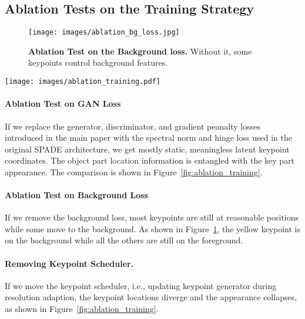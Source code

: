 \documentclass[10pt, conference, compsocconf]{IEEEtran}
\begin{document}
\subsection{Ablation Tests on the Training Strategy}

\begin{figure}
\texttt{[image: images/ablation\_bg\_loss.jpg]}
  \caption{\textbf{Ablation Test on the Background loss.} Without it, some keypoints control background features.
}
\label{fig:ablation_bg_loss}
\end{figure}

\begin{figure*}[t]
\begin{center}
   \texttt{[image: images/ablation\_training.pdf]}
\end{center}
   \caption{(Left) \textbf{GAN Loss Importance.} Without gradient penality + logistic loss, as in SPADE, keypoint coordinates remain static. (Right) \textbf{Scheduling the keypoint generator learning rate.} Reducing the learning rate after each progressive up-scaling step prevents mode collapse and enables high-resolution training. }
\label{fig:ablation_training}
\end{figure*}

\paragraph{Ablation Test on GAN Loss}
If we replace the generator, discriminator, and gradient peanalty losses introduced in the main paper  with the spectral norm \cite{miyato2018spectral} and hinge loss \cite{miyato2018spectral, park2019semantic} used in the original SPADE architecture, we get mostly static, meaningless  latent keypoint coordinates. The object part location information is entangled with the key part appearance. The comparison is shown in Figure~\ref{fig:ablation_training}.

\paragraph{Ablation Test on Background Loss}
If we remove the background loss, most keypoints are still at reasonable positions while some move to the background. As shown in Figure~\ref{fig:ablation_bg_loss}, the yellow keypoint is on the background while all the others are still on the foreground. 

\paragraph{Removing Keypoint Scheduler.} If we move the keypoint scheduler, i.e., updating keypoint generator during resolution adaption, the keypoint locations diverge and the appearance collapses, as shown in Figure~\ref{fig:ablation_training}.
\end{document}
